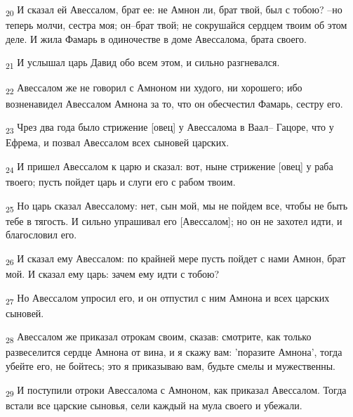 \begin{tcolorbox}
\textsubscript{20} И сказал ей Авессалом, брат ее: не Амнон ли, брат твой, был с тобою? --но теперь молчи, сестра моя; он--брат твой; не сокрушайся сердцем твоим об этом деле. И жила Фамарь в одиночестве в доме Авессалома, брата своего.
\end{tcolorbox}
\begin{tcolorbox}
\textsubscript{21} И услышал царь Давид обо всем этом, и сильно разгневался.
\end{tcolorbox}
\begin{tcolorbox}
\textsubscript{22} Авессалом же не говорил с Амноном ни худого, ни хорошего; ибо возненавидел Авессалом Амнона за то, что он обесчестил Фамарь, сестру его.
\end{tcolorbox}
\begin{tcolorbox}
\textsubscript{23} Чрез два года было стрижение [овец] у Авессалома в Ваал-- Гацоре, что у Ефрема, и позвал Авессалом всех сыновей царских.
\end{tcolorbox}
\begin{tcolorbox}
\textsubscript{24} И пришел Авессалом к царю и сказал: вот, ныне стрижение [овец] у раба твоего; пусть пойдет царь и слуги его с рабом твоим.
\end{tcolorbox}
\begin{tcolorbox}
\textsubscript{25} Но царь сказал Авессалому: нет, сын мой, мы не пойдем все, чтобы не быть тебе в тягость. И сильно упрашивал его [Авессалом]; но он не захотел идти, и благословил его.
\end{tcolorbox}
\begin{tcolorbox}
\textsubscript{26} И сказал ему Авессалом: по крайней мере пусть пойдет с нами Амнон, брат мой. И сказал ему царь: зачем ему идти с тобою?
\end{tcolorbox}
\begin{tcolorbox}
\textsubscript{27} Но Авессалом упросил его, и он отпустил с ним Амнона и всех царских сыновей.
\end{tcolorbox}
\begin{tcolorbox}
\textsubscript{28} Авессалом же приказал отрокам своим, сказав: смотрите, как только развеселится сердце Амнона от вина, и я скажу вам: 'поразите Амнона', тогда убейте его, не бойтесь; это я приказываю вам, будьте смелы и мужественны.
\end{tcolorbox}
\begin{tcolorbox}
\textsubscript{29} И поступили отроки Авессалома с Амноном, как приказал Авессалом. Тогда встали все царские сыновья, сели каждый на мула своего и убежали.
\end{tcolorbox}

